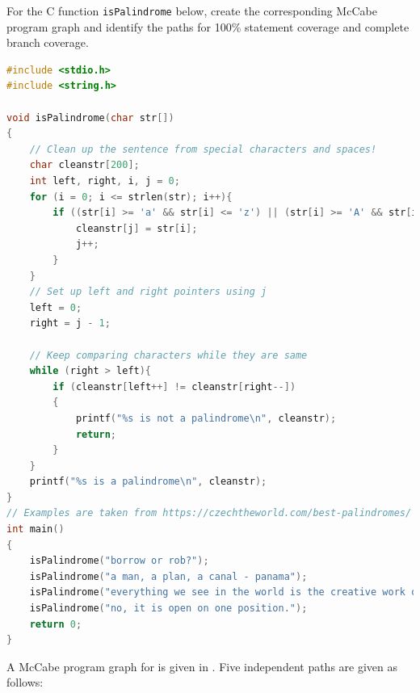 \begin{example}
For the C function \lstinline!isPalindrome! below, create the corresponding McCabe program graph and identify the paths for 100\% statement coverage and complete branch coverage.
\begin{lstlisting}[language=C, caption={A C program to check if a given string is a palindrome or not.}]
#include <stdio.h>
#include <string.h>
 
void isPalindrome(char str[])
{
    // Clean up the sentence from special characters and spaces!
    char cleanstr[200];
    int left, right, i, j = 0;
    for (i = 0; i <= strlen(str); i++){
	   	if ((str[i] >= 'a' && str[i] <= 'z') || (str[i] >= 'A' && str[i] <= 'Z')){
		 	cleanstr[j] = str[i];
		 	j++;
    	}
    }
	// Set up left and right pointers using j
   	left = 0;
    right = j - 1;
 
    // Keep comparing characters while they are same
    while (right > left){
	    if (cleanstr[left++] != cleanstr[right--])
        {
            printf("%s is not a palindrome\n", cleanstr);
            return;
        }
    }
    printf("%s is a palindrome\n", cleanstr);		    
}
// Examples are taken from https://czechtheworld.com/best-palindromes/
int main()
{
    isPalindrome("borrow or rob?");
    isPalindrome("a man, a plan, a canal - panama");
    isPalindrome("everything we see in the world is the creative work of women.");
    isPalindrome("no, it is open on one position.");
    return 0;
}
\end{lstlisting}
\end{example}
A McCabe program graph for  is given in . Five independent paths are given as follows:

